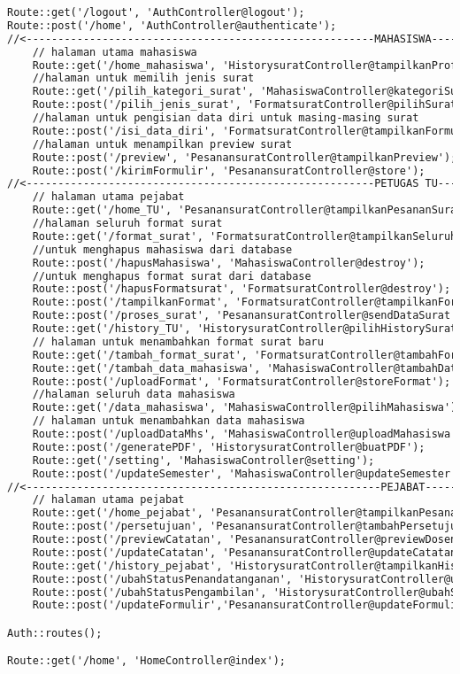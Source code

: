 \begin{lstlisting}[language=tex,basicstyle=
\tiny,caption=route.php]
Route::get('/logout', 'AuthController@logout');
Route::post('/home', 'AuthController@authenticate');
//<-------------------------------------------------------MAHASISWA------------------------------------------------------->
    // halaman utama mahasiswa
    Route::get('/home_mahasiswa', 'HistorysuratController@tampilkanProfil');
    //halaman untuk memilih jenis surat
    Route::get('/pilih_kategori_surat', 'MahasiswaController@kategoriSurat');
    Route::post('/pilih_jenis_surat', 'FormatsuratController@pilihSurat');
    //halaman untuk pengisian data diri untuk masing-masing surat
    Route::post('/isi_data_diri', 'FormatsuratController@tampilkanFormulir');
    //halaman untuk menampilkan preview surat
    Route::post('/preview', 'PesanansuratController@tampilkanPreview');
    Route::post('/kirimFormulir', 'PesanansuratController@store');
//<-------------------------------------------------------PETUGAS TU------------------------------------------------------>
    // halaman utama pejabat
    Route::get('/home_TU', 'PesanansuratController@tampilkanPesananSurat');
    //halaman seluruh format surat
    Route::get('/format_surat', 'FormatsuratController@tampilkanSeluruhFormat');
    //untuk menghapus mahasiswa dari database
    Route::post('/hapusMahasiswa', 'MahasiswaController@destroy');
    //untuk menghapus format surat dari database
    Route::post('/hapusFormatsurat', 'FormatsuratController@destroy');
    Route::post('/tampilkanFormat', 'FormatsuratController@tampilkanFormat');
    Route::post('/proses_surat', 'PesanansuratController@sendDataSurat');
    Route::get('/history_TU', 'HistorysuratController@pilihHistorySurat');
    // halaman untuk menambahkan format surat baru
    Route::get('/tambah_format_surat', 'FormatsuratController@tambahFormat');
    Route::get('/tambah_data_mahasiswa', 'MahasiswaController@tambahDataMahasiswa');
    Route::post('/uploadFormat', 'FormatsuratController@storeFormat');
    //halaman seluruh data mahasiswa
    Route::get('/data_mahasiswa', 'MahasiswaController@pilihMahasiswa');
    // halaman untuk menambahkan data mahasiswa
    Route::post('/uploadDataMhs', 'MahasiswaController@uploadMahasiswa');
    Route::post('/generatePDF', 'HistorysuratController@buatPDF');
    Route::get('/setting', 'MahasiswaController@setting');
    Route::post('/updateSemester', 'MahasiswaController@updateSemester');
//<--------------------------------------------------------PEJABAT-------------------------------------------------------->
    // halaman utama pejabat
    Route::get('/home_pejabat', 'PesanansuratController@tampilkanPesananDiPejabat');
    Route::post('/persetujuan', 'PesanansuratController@tambahPersetujuan');
    Route::post('/previewCatatan', 'PesanansuratController@previewDosen');
    Route::post('/updateCatatan', 'PesanansuratController@updateCatatan');
    Route::get('/history_pejabat', 'HistorysuratController@tampilkanHistoryDiPejabat');
    Route::post('/ubahStatusPenandatanganan', 'HistorysuratController@ubahStatusPenandatanganan');
    Route::post('/ubahStatusPengambilan', 'HistorysuratController@ubahStatusPengambilan');
    Route::post('/updateFormulir','PesanansuratController@updateFormulir');

Auth::routes();

Route::get('/home', 'HomeController@index');
\end{lstlisting}
